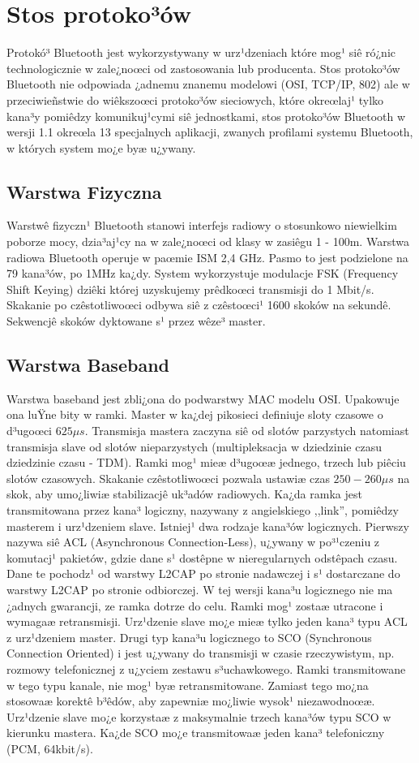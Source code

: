 \section{Stos protoko³ów}\label{sec:stos}
Protokó³ Bluetooth jest wykorzystywany w urz¹dzeniach które mog¹ siê
ró¿nic technologicznie w zale¿noœci od zastosowania lub producenta.
Stos protoko³ów Bluetooth nie odpowiada ¿adnemu znanemu modelowi
(OSI, TCP/IP, 802) ale w przeciwieñstwie do wiêkszoœci protoko³ów
sieciowych, które okreœlaj¹ tylko kana³y pomiêdzy komunikuj¹cymi
siê jednostkami, stos protoko³ów Bluetooth w wersji 1.1 okreœla 13
specjalnych aplikacji, zwanych profilami systemu Bluetooth, w
których system mo¿e byæ u¿ywany.
%
\subsection{Warstwa Fizyczna}
\label{sec:Warstwa Fizyczna}

Warstwê fizyczn¹ Bluetooth stanowi interfejs radiowy o stosunkowo
niewielkim poborze mocy, dzia³aj¹cy na w zale¿noœci od klasy w
zasiêgu 1 - 100m. Warstwa radiowa Bluetooth operuje w paœmie ISM
2,4 GHz. Pasmo to jest podzielone na 79 kana³ów, po 1MHz ka¿dy.
System wykorzystuje modulacje FSK (Frequency Shift Keying) dziêki
której uzyskujemy prêdkoœci transmisji do 1 Mbit/s. Skakanie po
czêstotliwoœci odbywa siê z czêstoœci¹ 1600 skoków na sekundê.
Sekwencjê skoków dyktowane s¹ przez wêze³ master.
%
\subsection{Warstwa Baseband}
\label{sec:Warstwa Baseband} Warstwa baseband jest zbli¿ona do
podwarstwy MAC modelu OSI. Upakowuje ona luŸne bity w ramki. Master
w ka¿dej pikosieci definiuje sloty czasowe o d³ugoœci $625 \mu s$.
Transmisja mastera zaczyna siê od slotów parzystych natomiast
transmisja slave od slotów nieparzystych (multipleksacja w
dziedzinie czasu dziedzinie czasu - TDM). Ramki mog¹ mieæ d³ugoœæ
jednego, trzech lub piêciu slotów czasowych. Skakanie czêstotliwoœci
pozwala ustawiæ czas $250 - 260 \mu s$ na skok, aby umo¿liwiæ
stabilizacjê uk³adów radiowych. Ka¿da ramka jest transmitowana
przez kana³ logiczny, nazywany z angielskiego ,,link'', pomiêdzy
masterem i urz¹dzeniem slave. Istniej¹ dwa rodzaje kana³ów
logicznych. Pierwszy nazywa siê ACL (Asynchronous Connection-Less),
u¿ywany w po³¹czeniu z komutacj¹ pakietów, gdzie dane s¹ dostêpne w
nieregularnych odstêpach czasu. Dane te pochodz¹ od warstwy L2CAP po
stronie nadawczej i s¹ dostarczane do warstwy L2CAP po stronie
odbiorczej. W tej wersji kana³u logicznego nie ma ¿adnych gwarancji,
ze ramka dotrze do celu. Ramki mog¹ zostaæ utracone i wymagaæ
retransmisji. Urz¹dzenie slave mo¿e mieæ tylko jeden kana³ typu ACL
z urz¹dzeniem master. Drugi typ kana³u logicznego to SCO
(Synchronous Connection Oriented) i jest u¿ywany do transmisji w
czasie rzeczywistym, np. rozmowy telefonicznej z u¿yciem zestawu
s³uchawkowego. Ramki transmitowane w tego typu kanale, nie mog¹ byæ
retransmitowane. Zamiast tego mo¿na stosowaæ korektê b³êdów, aby
zapewniæ mo¿liwie wysok¹ niezawodnoœæ. Urz¹dzenie slave mo¿e
korzystaæ z maksymalnie trzech kana³ów typu SCO w kierunku mastera.
Ka¿de  SCO mo¿e transmitowaæ jeden kana³ telefoniczny (PCM,
64kbit/s).
%
